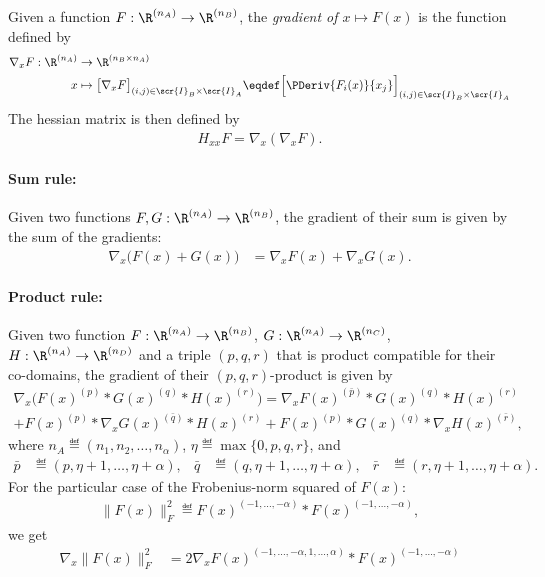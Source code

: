 \documentclass[11pt]{article}
\theoremstyle{remark}
\begin{document}
Given a function $F:\R^{(n_A)}\to\R^{(n_B)}$, the \emph{gradient of
  $x\mapsto F(x)$} is the function defined by
\begin{align*}
  \nabla_x F:\R^{(n_A)}&\to\R^{(n_B\times n_A)}\\
  x&\mapsto\big[\nabla_x F\big]_{(i,j)\in\scr{I}_B\times\scr{I}_A}
  \eqdef\Big[\PDeriv{F_i(x)}{x_j}\Big]_{(i,j)\in\scr{I}_B\times\scr{I}_A}
\end{align*}
The hessian matrix is then defined by
\begin{align*}
  H_{xx} F=\nabla_x (\nabla_x F).
\end{align*}

\paragraph{Sum rule:} Given two functions
$F,G:\R^{(n_A)}\to\R^{(n_B)}$, the gradient of their sum is
given by the sum of the gradients:
\begin{align*}
  \nabla_x \big( F(x)+G(x) \big)
  &=\nabla_x F(x)+ \nabla_xG(x).
\end{align*}
\paragraph{Product rule:} Given two function
$F:\R^{(n_A)}\to\R^{(n_B)}$, $G:\R^{(n_A)}\to\R^{(n_C)}$,
$H:\R^{(n_A)}\to\R^{(n_D)}$ and a triple $(p,q,r)$ that is product
compatible for their co-domains, the gradient of their
$(p,q,r)$-product is given by
\begin{multline*}
  \nabla_x \big( F(x)^{(p)} * G(x)^{(q)} * H(x)^{(r)} \big)
  =\nabla_xF(x)^{(\bar p)} * G(x)^{(q)} * H(x)^{(r)}\\
  + F(x)^{(p)} * \nabla_xG(x)^{(\bar q)} * H(x)^{(r)}
  + F(x)^{(p)} *  G(x)^{(q)} * \nabla_x H(x)^{(\bar r)},
\end{multline*}
where $n_A\eqdef(n_1,n_2,\dots,n_\alpha)$, $\eta\eqdef\max\{0,p,q,r\}$, and
\begin{align*}
  \bar p&\eqdef(p,\eta+1,\dots,\eta+\alpha), &
  \bar q&\eqdef(q,\eta+1,\dots,\eta+\alpha), &
  \bar r&\eqdef(r,\eta+1,\dots,\eta+\alpha).
\end{align*}
For the particular case of the Frobenius-norm squared of $F(x)$:
\begin{align*}
  \| F(x) \|_F^2\eqdef F(x)^{(-1,\dots,-\alpha)} * F(x)^{(-1,\dots,-\alpha)},
\end{align*}
we get
\begin{align*}
  \nabla_x \|F(x)\|_F^2 &=2 \nabla_xF(x)^{(-1,\dots,-\alpha,1,\dots,\alpha)} * F(x)^{(-1,\dots,-\alpha)}
\end{align*}
\end{document}
